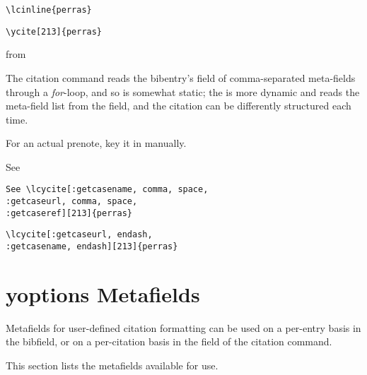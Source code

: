 
\begin{magpar}
\begin{verbatim}
\lcinline{perras}
\end{verbatim}
\end{magpar}


\begin{magpar}
\begin{verbatim}
\ycite[213]{perras}
\end{verbatim}
\end{magpar}

from


\p The  citation command reads the bibentry's  field of comma-separated meta-fields through a \textit{for}-loop, and so is somewhat static; the  is more dynamic and reads the meta-field list from the  field, and the citation can be differently structured each time.

\p For an actual prenote, key it in manually.

\bigskip
See 
\begin{magpar}
\begin{verbatim}
See \lcycite[:getcasename, comma, space, 
:getcaseurl, comma, space, 
:getcaseref][213]{perras}
\end{verbatim}
\end{magpar}

\bigskip
{}
\begin{magpar}
\begin{verbatim}
\lcycite[:getcaseurl, endash, 
:getcasename, endash][213]{perras}
\end{verbatim}
\end{magpar}

\section{yoptions Metafields}
\p Metafields for user-defined citation formatting can be used on a per-entry basis in the  bibfield, or  on a per-citation basis in the  field of the  citation command.

\p This section lists the metafields available for use.

